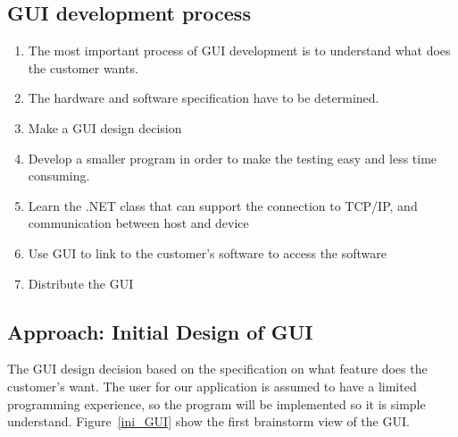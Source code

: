 \subsection{GUI development process} 
\flushleft
\begin{enumerate}


\item	The most important process of GUI development is to understand what does the customer wants. 

\item	The hardware and software specification have to be determined.
 
\item	Make a GUI design decision

\item Develop a smaller program in order to make the testing easy and less time consuming. 

\item	Learn the .NET class that can support the connection to TCP/IP, and communication between host and device

\item	Use GUI to link to the customer’s software to access the software

\item	Distribute the GUI
\end{enumerate}

\subsection{Approach: Initial Design of GUI}
The GUI design decision based on the specification on what feature does the customer’s want. The user for our application is assumed to have a limited programming experience, so the program will be implemented so it is simple understand. Figure~\ref{ini_GUI} show the first brainstorm view of the GUI. 

